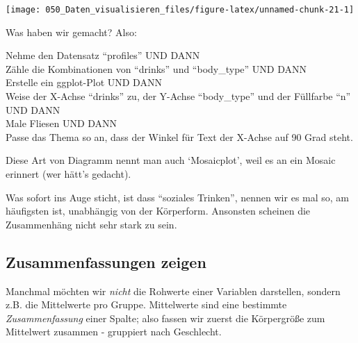 \documentclass[12pt,ngerman,]{book}
\makeatletter
\newenvironment{Shaded}{\begin{snugshade}}{\end{snugshade}}
\newcommand{\KeywordTok}[1]{\textcolor[rgb]{0.13,0.29,0.53}{\textbf{#1}}}
\newcommand{\DataTypeTok}[1]{\textcolor[rgb]{0.13,0.29,0.53}{#1}}
\newcommand{\StringTok}[1]{\textcolor[rgb]{0.31,0.60,0.02}{#1}}
\newcommand{\CommentTok}[1]{\textcolor[rgb]{0.56,0.35,0.01}{\textit{#1}}}
\newcommand{\OtherTok}[1]{\textcolor[rgb]{0.56,0.35,0.01}{#1}}
\newcommand{\OperatorTok}[1]{\textcolor[rgb]{0.81,0.36,0.00}{\textbf{#1}}}
\newcommand{\NormalTok}[1]{#1}
\newenvironment{kframe}{%
\medskip{}
\setlength{\fboxsep}{.8em}
 \def\at@end@of@kframe{}%
 \ifinner\ifhmode%
  \def\at@end@of@kframe{\end{minipage}}%
  \begin{minipage}{\columnwidth}%
 \fi\fi%
 \def\FrameCommand##1{\hskip\@totalleftmargin \hskip-\fboxsep
 \colorbox{shadecolor}{##1}\hskip-\fboxsep
     \hskip-\linewidth \hskip-\@totalleftmargin \hskip\columnwidth}%
 \MakeFramed {\advance\hsize-\width
   \@totalleftmargin\z@ \linewidth\hsize
   \@setminipage}}%
 {\par\unskip\endMakeFramed%
 \at@end@of@kframe}
\renewenvironment{Shaded}{\begin{kframe}}{\end{kframe}}
\theoremstyle{definition}
\theoremstyle{definition}
\theoremstyle{remark}
\let\BeginKnitrBlock\begin \let\EndKnitrBlock\end
\makeatother
\begin{document}
\begin{center}\texttt{[image: 050\_Daten\_visualisieren\_files/figure-latex/unnamed-chunk-21-1]} \end{center}

Was haben wir gemacht? Also:

\BeginKnitrBlock{rmdpseudocode}
Nehme den Datensatz ``profiles'' UND DANN\\
Zähle die Kombinationen von ``drinks'' und ``body\_type'' UND DANN\\
Erstelle ein ggplot-Plot UND DANN\\
Weise der X-Achse ``drinks'' zu, der Y-Achse ``body\_type'' und der
Füllfarbe ``n'' UND DANN\\
Male Fliesen UND DANN\\
Passe das Thema so an, dass der Winkel für Text der X-Achse auf 90 Grad
steht.
\EndKnitrBlock{rmdpseudocode}

Diese Art von Diagramm nennt man auch `Mosaicplot', weil es an ein
Mosaic erinnert (wer hätt's gedacht).

Was sofort ins Auge sticht, ist dass ``soziales Trinken'', nennen wir es
mal so, am häufigsten ist, unabhängig von der Körperform. Ansonsten
scheinen die Zusammenhäng nicht sehr stark zu sein.

\subsection{Zusammenfassungen zeigen}\label{zusammenfassungen-zeigen}

Manchmal möchten wir \emph{nicht} die Rohwerte einer Variablen
darstellen, sondern z.B. die Mittelwerte pro Gruppe. Mittelwerte sind
eine bestimmte \emph{Zusammenfassung} einer Spalte; also fassen wir
zuerst die Körpergröße zum Mittelwert zusammen - gruppiert nach
Geschlecht.

\begin{Shaded}
\end{Shaded}
\end{document}
